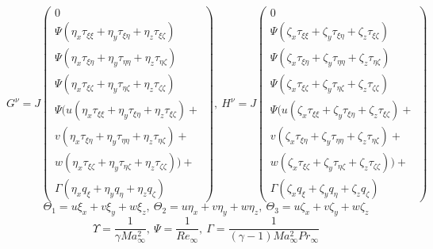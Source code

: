 \begin{equation}
\nonumber
G^\nu=J
\begin{pmatrix}
0
\\
\Psi \left(\eta_x \tau_{\xi \xi}+\eta_y \tau_{\xi \eta}+\eta_z \tau_{\xi \zeta}\right)
\\
\Psi \left(\eta_x \tau_{\xi \eta}+\eta_y \tau_{\eta \eta}+\eta_z \tau_{\eta \zeta}\right)
\\
\Psi \left(\eta_x \tau_{\xi \zeta}+\eta_y \tau_{\eta \zeta}+\eta_z \tau_{\zeta \zeta}\right)
\\ 
\Psi (
u\left(\eta_x \tau_{\xi \xi} + \eta_y \tau_{\xi \eta} + \eta_z \tau_{\xi \zeta}\right)+ \\ 
v\left(\eta_x \tau_{\xi \eta} + \eta_y \tau_{\eta \eta} + \eta_z \tau_{\eta \zeta}\right)+ \\ 
w\left(\eta_x \tau_{\xi \zeta} + \eta_y \tau_{\eta \zeta} + \eta_z \tau_{\zeta \zeta}\right))+ \\
\Gamma \left(
\eta_x q_\xi+\eta_y q_\eta+\eta_z q_\zeta
\right)
\end{pmatrix}
,\ 
H^\nu=J
\begin{pmatrix}
0
\\
\Psi \left(\zeta_x \tau_{\xi \xi}+\zeta_y \tau_{\xi \eta}+\zeta_z \tau_{\xi \zeta}\right)
\\
\Psi \left(\zeta_x \tau_{\xi \eta}+\zeta_y \tau_{\eta \eta}+\zeta_z \tau_{\eta \zeta}\right)
\\
\Psi \left(\zeta_x \tau_{\xi \zeta}+\zeta_y \tau_{\eta \zeta}+\zeta_z \tau_{\zeta \zeta}\right)
\\ 
\Psi (
u\left(\zeta_x \tau_{\xi \xi} + \zeta_y \tau_{\xi \eta} + \zeta_z \tau_{\xi \zeta}\right)+ \\ 
v\left(\zeta_x \tau_{\xi \eta} + \zeta_y \tau_{\eta \eta} + \zeta_z \tau_{\eta \zeta}\right)+ \\ 
w\left(\zeta_x \tau_{\xi \zeta} + \zeta_y \tau_{\eta \zeta} + \zeta_z \tau_{\zeta \zeta}\right))+ \\
\Gamma \left(
\zeta_x q_\xi+\zeta_y q_\eta+\zeta_z q_\zeta
\right)
\end{pmatrix}
\label{eq3}
\end{equation}
\begin{equation}
\nonumber
\Theta_1=u\xi_x+v\xi_y+w\xi_z,\ 
\Theta_2=u\eta_x+v\eta_y+w\eta_z,\ 
\Theta_3=u\zeta_x+v\zeta_y+w\zeta_z
\end{equation}
\begin{equation}
\nonumber
\Upsilon =\frac{1}{\gamma Ma_\infty^2},\ 
\Psi =\frac{1}{Re_\infty},\ 
\Gamma =\frac{1}{\left(\gamma -1 \right)Ma_\infty^2 Pr_\infty}
\end{equation}
